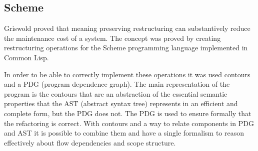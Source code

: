 
\subsection{Scheme}

Griswold \cite{griswold1991program} proved that meaning preserving restructuring can substantively reduce the maintenance cost of a system.
The concept was proved by creating restructuring operations for the Scheme programming language implemented in Common Lisp.





In order to be able to correctly implement these operations it was used contours and a PDG (program dependence graph). 
The main representation of the program is the contours that are an abstraction of the essential semantic properties that the AST (abstract syntax tree) represents in an efficient and complete form, but the PDG does not.
The PDG is used to ensure formally that the refactoring is correct.
With contours and a way to relate components in PDG and  AST it is possible to combine them and have a single formalism to reason effectively about flow dependencies and scope structure.

